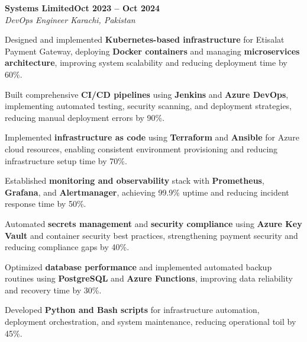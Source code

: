 \documentclass[letterpaper,10pt]{article}
\newcommand{\headingBf}[2]{
  \hspace{10pt}\textbf{#1}\hfill\textbf{#2}\\
}
\newcommand{\headingIt}[2]{
  \hspace{10pt}\textit{#1}\hfill\textit{#2}\\
}
\newenvironment{resume_list}{
  \vspace{-7pt}
  \begin{itemize}[itemsep=-2px, parsep=1pt, leftmargin=30pt]
}{
  \end{itemize}
}
\begin{document}
\headingBf{Systems Limited}{Oct 2023 -- Oct 2024}
\headingIt{DevOps Engineer \hfill Karachi, Pakistan}{}
\begin{resume_list}
    \item Designed and implemented \textbf{Kubernetes-based infrastructure} for Etisalat Payment Gateway, deploying \textbf{Docker containers} and managing \textbf{microservices architecture}, improving system scalability and reducing deployment time by 60\%.
    \item Built comprehensive \textbf{CI/CD pipelines} using \textbf{Jenkins} and \textbf{Azure DevOps}, implementing automated testing, security scanning, and deployment strategies, reducing manual deployment errors by 90\%.
    \item Implemented \textbf{infrastructure as code} using \textbf{Terraform} and \textbf{Ansible} for Azure cloud resources, enabling consistent environment provisioning and reducing infrastructure setup time by 70\%.
    \item Established \textbf{monitoring and observability} stack with \textbf{Prometheus}, \textbf{Grafana}, and \textbf{Alertmanager}, achieving 99.9\% uptime and reducing incident response time by 50\%.
    \item Automated \textbf{secrets management} and \textbf{security compliance} using \textbf{Azure Key Vault} and container security best practices, strengthening payment security and reducing compliance gaps by 40\%.
    \item Optimized \textbf{database performance} and implemented automated backup routines using \textbf{PostgreSQL} and \textbf{Azure Functions}, improving data reliability and recovery time by 30\%.
    \item Developed \textbf{Python and Bash scripts} for infrastructure automation, deployment orchestration, and system maintenance, reducing operational toil by 45\%.
\end{resume_list}
\end{document}
